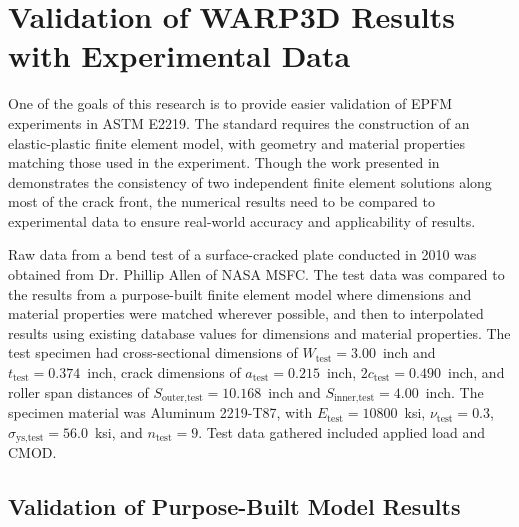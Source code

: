 \chapter{Validation of WARP3D Results with Experimental Data} \label{chap:experiment-validation}


One of the goals of this research is to provide easier validation of EPFM experiments in ASTM E2219.
The standard requires the construction of an elastic-plastic finite element model, with geometry and material properties matching those used in the experiment.
Though the work presented in  demonstrates the consistency of two independent finite element solutions along most of the crack front, the numerical results need to be compared to experimental data to ensure real-world accuracy and applicability of results.

Raw data from a bend test of a surface-cracked plate conducted in 2010 was obtained from Dr. Phillip Allen of NASA MSFC.
The test data was compared to the results from a purpose-built finite element model where dimensions and material properties were matched wherever possible, and then to interpolated results using existing database values for dimensions and material properties.
The test specimen had cross-sectional dimensions of \(W_\text{test}=3.00\)~inch and \(t_\text{test}=0.374\)~inch, crack dimensions of \(a_\text{test}=0.215\)~inch, \(2c_\text{test}=0.490\)~inch, and roller span distances of \(S_\text{outer,test}=10.168\)~inch and \(S_\text{inner,test}=4.00\)~inch.
The specimen material was Aluminum 2219-T87, with \(E_\text{test}=10800\)~ksi, \(\nu_\text{test}=0.3\), \(\sigma_\text{ys,test}=56.0\)~ksi, and \(n_\text{test}=9\).
Test data gathered included applied load and CMOD.
%

\section{Validation of Purpose-Built Model Results}
\label{sec:validation-purpose-built}

